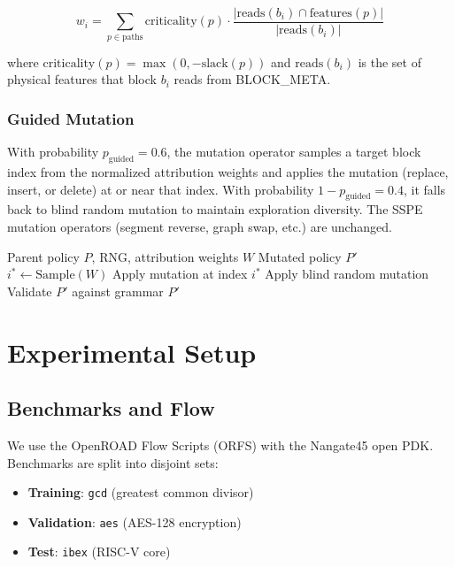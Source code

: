 \documentclass[conference]{IEEEtran}
\begin{document}
\begin{equation}
w_i = \sum_{p \in \text{paths}} \text{criticality}(p) \cdot \frac{|\text{reads}(b_i) \cap \text{features}(p)|}{|\text{reads}(b_i)|}
\end{equation}

where $\text{criticality}(p) = \max(0, -\text{slack}(p))$ and $\text{reads}(b_i)$ is the set of physical features that block $b_i$ reads from BLOCK\_META.

\subsubsection{Guided Mutation}
With probability $p_{\text{guided}} = 0.6$, the mutation operator samples a target block index from the normalized attribution weights and applies the mutation (replace, insert, or delete) at or near that index. With probability $1 - p_{\text{guided}} = 0.4$, it falls back to blind random mutation to maintain exploration diversity. The SSPE mutation operators (segment reverse, graph swap, etc.) are unchanged.

\begin{algorithm}[t]
\caption{Timing-Path-Guided Mutation}
\label{alg:tpgm}
\begin{algorithmic}[1]
\REQUIRE Parent policy $P$, RNG, attribution weights $W$
\ENSURE Mutated policy $P'$
  \STATE $i^* \leftarrow \text{Sample}(W)$ 
  \STATE Apply mutation at index $i^*$
\ELSE
  \STATE Apply blind random mutation
\ENDIF
\STATE Validate $P'$ against grammar
\RETURN $P'$
\end{algorithmic}
\end{algorithm}

\section{Experimental Setup}

\subsection{Benchmarks and Flow}
We use the OpenROAD Flow Scripts (ORFS) with the Nangate45 open PDK. Benchmarks are split into disjoint sets:
\begin{itemize}
\item \textbf{Training}: \texttt{gcd} (greatest common divisor)
\item \textbf{Validation}: \texttt{aes} (AES-128 encryption)
\item \textbf{Test}: \texttt{ibex} (RISC-V core)
\end{itemize}
\end{document}
